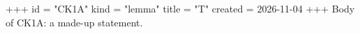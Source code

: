 +++
id = "CK1A"
kind = "lemma"
title = "T"
created = 2026-11-04
+++
Body of CK1A: a made-up statement.
